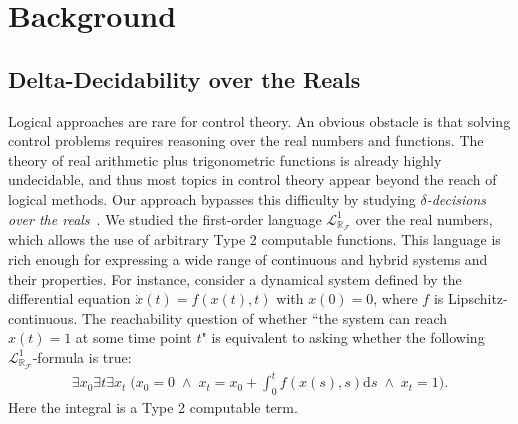 \documentclass[10pt]{article}
\newcommand{\lrf}{\mathcal{L}_{\mathbb{R}_{\mathcal{F}}}}
\theoremstyle{definition}
\begin{document}
\section{Background}

\subsection{Delta-Decidability over the Reals} 

Logical approaches are rare for control theory. An obvious obstacle is that solving control problems requires reasoning over the real numbers and functions. The theory of real arithmetic plus trigonometric functions is already highly undecidable, and thus most topics in control theory appear beyond the reach of logical methods. Our approach bypasses this difficulty by studying {\em $\delta$-decisions over the reals}~\cite{DBLP:conf/lics/GaoAC12}. We studied the first-order language $\lrf^1$ over the real numbers, which allows the use of arbitrary Type 2 computable functions. This language is rich enough for expressing a wide range of continuous and hybrid systems and their properties. For instance, consider a dynamical system defined by the differential equation $\dot{x}(t) = f(x(t),t)$ with $x(0)= 0$, where $f$ is Lipschitz-continuous. The reachability question of whether ``the system can reach $x(t)=1$ at some time point $t$" is equivalent to asking whether the following $\mathcal{L}^1_{\mathbb{R}_{\mathcal{F}}}$-formula is true:
\begin{eqnarray*}\exists x_0 \exists t \exists x_t\; \bigg(x_0 = 0 \;\wedge\; x_t = x_0 + \int_{0}^t f(x(s),s)\mathrm{d}s\; \wedge\; x_t = 1\bigg).\end{eqnarray*}
Here the integral is a Type 2 computable term. 
\end{document}
